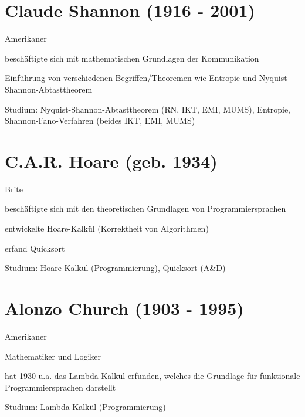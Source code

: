 \documentclass[a4paper,12pt]{report}
\begin{document}
\section*{Claude Shannon (1916 - 2001)}
\begin{itemize*}
	\item Amerikaner
	\item beschäftigte sich mit mathematischen Grundlagen der Kommunikation
	\item Einführung von verschiedenen Begriffen/Theoremen wie Entropie und Nyquist-Shannon-Abtasttheorem
	\item Studium: Nyquist-Shannon-Abtasttheorem (RN, IKT, EMI, MUMS), Entropie, Shannon-Fano-Verfahren (beides IKT, EMI, MUMS)
\end{itemize*}

\section*{C.A.R. Hoare (geb. 1934)}
\begin{itemize*}
	\item Brite
	\item beschäftigte sich mit den theoretischen Grundlagen von Programmiersprachen
	\item entwickelte Hoare-Kalkül (Korrektheit von Algorithmen)
	\item erfand Quicksort
	\item Studium: Hoare-Kalkül (Programmierung), Quicksort (A\&D)
\end{itemize*}

\section*{Alonzo Church (1903 - 1995)}
\begin{itemize*}
	\item Amerikaner
	\item Mathematiker und Logiker
	\item hat 1930 u.a. das Lambda-Kalkül erfunden, welches die Grundlage für funktionale Programmiersprachen darstellt
	\item Studium: Lambda-Kalkül (Programmierung)
\end{itemize*}
\end{document}

